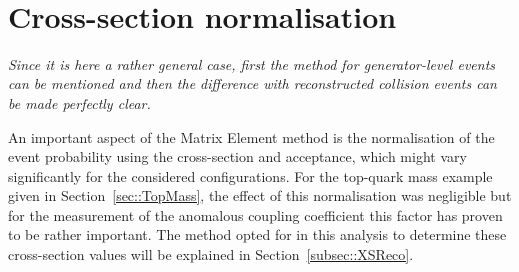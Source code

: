 ~~~


\section{Cross-section  normalisation} \label{sec::Norm}
\textit{Since it is here a rather general case, first the method for generator-level events can be mentioned and then the difference with reconstructed collision events can be made perfectly clear.}

An important aspect of the Matrix Element method is the normalisation of the event probability using the cross-section and acceptance, which might vary significantly for the considered configurations. For the top-quark mass example given in Section~\ref{sec::TopMass}, the effect of this normalisation was negligible but for the measurement of the anomalous coupling coefficient this factor has proven to be rather important. The method opted for in this analysis to determine these cross-section values will be explained in Section~\ref{subsec::XSReco}.

